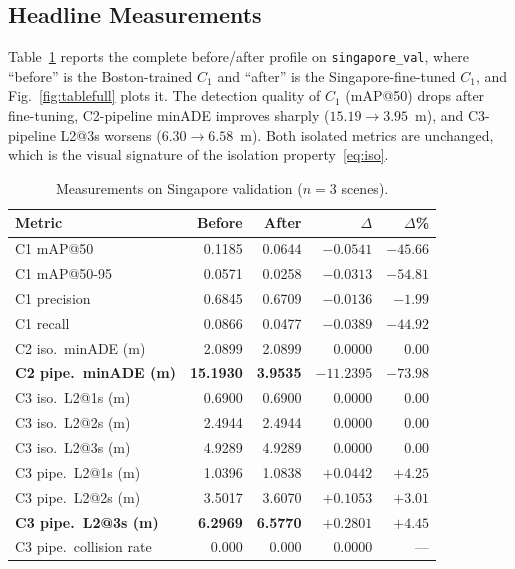 \documentclass[conference]{IEEEtran}
\begin{document}
\subsection{Headline Measurements}
Table~\ref{tab:results} reports the complete before/after profile on
\texttt{singapore\_val}, where ``before'' is the Boston-trained $C_1$ and
``after'' is the Singapore-fine-tuned $C_1$, and Fig.~\ref{fig:tablefull}
plots it. The detection quality of $C_1$ (mAP@50) drops after fine-tuning,
C2-pipeline minADE improves sharply ($15.19 \to 3.95$~m), and C3-pipeline
L2@3s worsens ($6.30 \to 6.58$~m). Both isolated metrics are unchanged, which
is the visual signature of the isolation property~\eqref{eq:iso}.

\begin{table}[htbp]
\caption{Measurements on Singapore validation ($n=3$ scenes).}
\label{tab:results}
\centering
\renewcommand{\arraystretch}{1.2}
\setlength{\tabcolsep}{4pt}
\begin{tabular}{@{}lrrrr@{}}
\toprule
\textbf{Metric} & \textbf{Before} & \textbf{After} & \textbf{$\Delta$} & \textbf{$\Delta$\%} \\
\midrule
C1 mAP@50                & 0.1185  & 0.0644 & $-0.0541$  & $-45.66$ \\
C1 mAP@50-95             & 0.0571  & 0.0258 & $-0.0313$  & $-54.81$ \\
C1 precision             & 0.6845  & 0.6709 & $-0.0136$  & $-1.99$  \\
C1 recall                & 0.0866  & 0.0477 & $-0.0389$  & $-44.92$ \\
C2 iso.\ minADE (m)      & 2.0899  & 2.0899 & $0.0000$   & $0.00$   \\
\textbf{C2 pipe.\ minADE (m)} & \textbf{15.1930} & \textbf{3.9535} & $\mathbf{-11.2395}$ & $\mathbf{-73.98}$ \\
C3 iso.\ L2@1s (m)       & 0.6900  & 0.6900 & $0.0000$   & $0.00$   \\
C3 iso.\ L2@2s (m)       & 2.4944  & 2.4944 & $0.0000$   & $0.00$   \\
C3 iso.\ L2@3s (m)       & 4.9289  & 4.9289 & $0.0000$   & $0.00$   \\
C3 pipe.\ L2@1s (m)      & 1.0396  & 1.0838 & $+0.0442$  & $+4.25$  \\
C3 pipe.\ L2@2s (m)      & 3.5017  & 3.6070 & $+0.1053$  & $+3.01$  \\
\textbf{C3 pipe.\ L2@3s (m)} & \textbf{6.2969} & \textbf{6.5770} & $\mathbf{+0.2801}$ & $\mathbf{+4.45}$ \\
C3 pipe.\ collision rate & 0.000   & 0.000  & $0.0000$   & --- \\
\bottomrule
\end{tabular}
\end{table}
\end{document}

